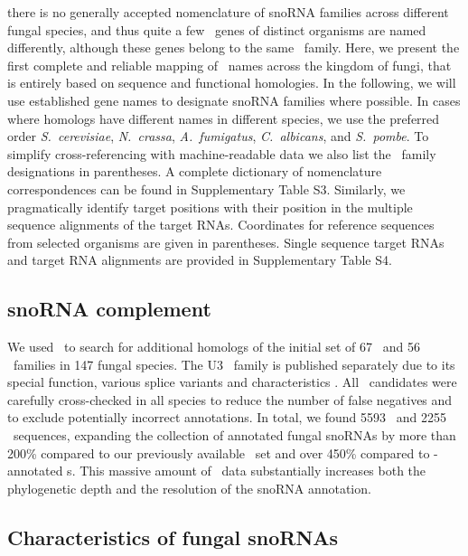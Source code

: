  there is no generally accepted nomenclature of snoRNA
families across different fungal species, and thus quite a few \sno\ genes
of distinct organisms are named differently, although these genes belong to
the same \sno\ family. Here, we present the first complete and reliable
mapping of \sno\ names across the kingdom of fungi, that is entirely based
on sequence and functional homologies.  In the following, we will use
established gene names to designate snoRNA families where possible. In
cases where homologs have different names in different species, we use the
preferred order \emph{S.\ cerevisiae}, \emph{N.\ crassa}, \emph{A.\
  fumigatus}, \emph{C.\ albicans}, and \emph{S.\ pombe}. To simplify
cross-referencing with machine-readable data we also list the \snostrip\
family designations in parentheses.  A complete dictionary of nomenclature
correspondences can be found in Supplementary Table S3.  Similarly, we
pragmatically identify target positions with their position in the multiple
sequence alignments of the target RNAs. Coordinates for reference sequences
from selected organisms are given in parentheses.  Single sequence target
RNAs and target RNA alignments are provided in Supplementary Table S4.

\subsection{\PFS{Expanded complement of fungal} snoRNA complement}

We used \snostrip\ to search for additional homologs of the initial set of
67 \cd\ and 56 \haca\ families in 147 fungal species. The U3 \sno\ family
is published separately due to its special function, various splice
variants and characteristics \cite{Canzler:2017}. All \snostrip\ candidates
were carefully cross-checked in all species to reduce the number of false
negatives and to exclude potentially incorrect annotations.  In total, we
found 5593 \cd\ and 2255 \haca\ sequences, expanding the collection of
annotated fungal snoRNAs by more than 200\% compared to our previously
available \sno\ set \cite{Bartschat:2014} and over 450\% compared to
\rfam{}-annotated \sno s. This massive amount of \sno\ data substantially
increases both the phylogenetic depth and the resolution of the snoRNA
annotation.

\subsection{Characteristics of fungal snoRNAs}

